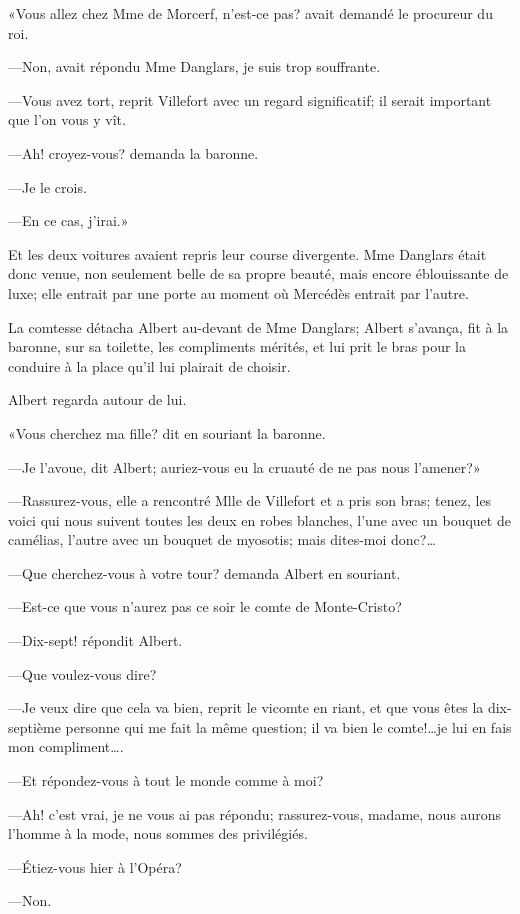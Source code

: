 «Vous allez chez Mme de Morcerf, n'est-ce pas? avait demandé le procureur du roi. 

—Non, avait répondu Mme Danglars, je suis trop souffrante. 

—Vous avez tort, reprit Villefort avec un regard significatif; il serait important que l'on vous y vît. 

—Ah! croyez-vous? demanda la baronne. 

—Je le crois. 

—En ce cas, j'irai.» 

Et les deux voitures avaient repris leur course divergente. Mme Danglars était donc venue, non seulement belle de sa propre beauté, mais encore éblouissante de luxe; elle entrait par une porte au moment où Mercédès entrait par l'autre. 

La comtesse détacha Albert au-devant de Mme Danglars; Albert s'avança, fit à la baronne, sur sa toilette, les compliments mérités, et lui prit le bras pour la conduire à la place qu'il lui plairait de choisir. 

Albert regarda autour de lui. 

«Vous cherchez ma fille? dit en souriant la baronne. 

—Je l'avoue, dit Albert; auriez-vous eu la cruauté de ne pas nous l'amener?» 

—Rassurez-vous, elle a rencontré Mlle de Villefort et a pris son bras; tenez, les voici qui nous suivent toutes les deux en robes blanches, l'une avec un bouquet de camélias, l'autre avec un bouquet de myosotis; mais dites-moi donc?\dots 

—Que cherchez-vous à votre tour? demanda Albert en souriant. 

—Est-ce que vous n'aurez pas ce soir le comte de Monte-Cristo? 

—Dix-sept! répondit Albert. 

—Que voulez-vous dire? 

—Je veux dire que cela va bien, reprit le vicomte en riant, et que vous êtes la dix-septième personne qui me fait la même question; il va bien le comte!\dots je lui en fais mon compliment\dots. 

—Et répondez-vous à tout le monde comme à moi? 

—Ah! c'est vrai, je ne vous ai pas répondu; rassurez-vous, madame, nous aurons l'homme à la mode, nous sommes des privilégiés. 

—Étiez-vous hier à l'Opéra? 

—Non. 

